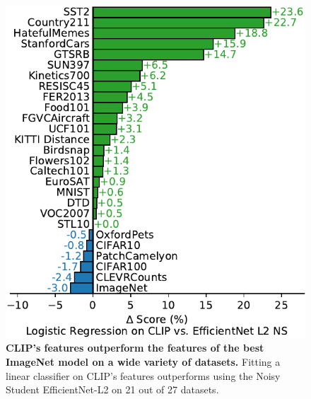 \documentclass{article}
\begin{document}
\begin{figure}[t]
\begin{center}
\centerline{\includegraphics[width=\columnwidth]{linear-probe-clip-vs-enet.pdf}}
\caption{\textbf{CLIP's features outperform the features of the best ImageNet model on a wide variety of datasets.} Fitting a linear classifier on CLIP's features outperforms using the Noisy Student EfficientNet-L2 on 21 out of 27 datasets.}
\label{linear-probe-clip-vs-enet}
\end{center}
\vspace{-1cm}
\end{figure}
\end{document}
